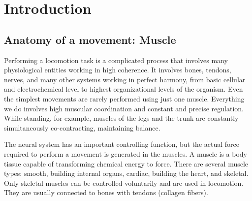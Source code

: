 

\chapter{Introduction}

\section{Anatomy of a movement: Muscle} %
Performing a locomotion task is a complicated process that involves many physiological entities working in high coherence. It involves bones, tendons, nerves, and many other systems working in perfect harmony, from basic cellular and electrochemical level to highest organizational levels of the organism. Even the simplest movements are rarely performed using just one muscle. Everything we do involves high muscular coordination and constant and precise regulation. While standing, for example, muscles of the legs and the trunk are constantly simultaneously co-contracting, maintaining balance.  

The neural system has an important controlling function, but the actual force required to perform a movement is generated in the muscles. A muscle is a body tissue capable of transforming chemical energy to force. There are several muscle types: smooth, building internal organs, cardiac, building the heart, and skeletal. Only skeletal muscles can be controlled voluntarily and are used in locomotion. They are usually connected to bones with tendons (collagen fibers).

